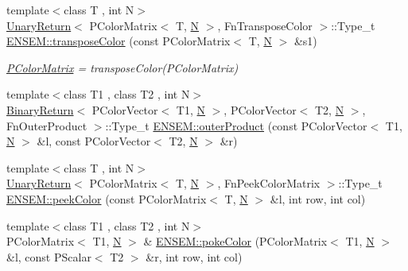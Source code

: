 \begin{DoxyCompactItemize}
\item 
{\footnotesize template$<$class T , int N$>$ }\\\mbox{\hyperlink{structUnaryReturn}{Unary\+Return}}$<$ P\+Color\+Matrix$<$ T, \mbox{\hyperlink{adat__devel_2lib_2hadron_2operator__name__util_8cc_a7722c8ecbb62d99aee7ce68b1752f337}{N}} $>$, Fn\+Transpose\+Color $>$\+::Type\+\_\+t \mbox{\hyperlink{group__primcolormatrix_gad27a30bd1b98827095b42464443c9ffc}{E\+N\+S\+E\+M\+::transpose\+Color}} (const P\+Color\+Matrix$<$ T, \mbox{\hyperlink{adat__devel_2lib_2hadron_2operator__name__util_8cc_a7722c8ecbb62d99aee7ce68b1752f337}{N}} $>$ \&s1)
\begin{DoxyCompactList}\small\item\em \mbox{\hyperlink{classENSEM_1_1PColorMatrix}{P\+Color\+Matrix}} = transpose\+Color(\+P\+Color\+Matrix) \end{DoxyCompactList}\item 
{\footnotesize template$<$class T1 , class T2 , int N$>$ }\\\mbox{\hyperlink{structBinaryReturn}{Binary\+Return}}$<$ P\+Color\+Vector$<$ T1, \mbox{\hyperlink{adat__devel_2lib_2hadron_2operator__name__util_8cc_a7722c8ecbb62d99aee7ce68b1752f337}{N}} $>$, P\+Color\+Vector$<$ T2, \mbox{\hyperlink{adat__devel_2lib_2hadron_2operator__name__util_8cc_a7722c8ecbb62d99aee7ce68b1752f337}{N}} $>$, Fn\+Outer\+Product $>$\+::Type\+\_\+t \mbox{\hyperlink{group__primcolormatrix_ga4f0b21163125568ab5bcbbef75a17973}{E\+N\+S\+E\+M\+::outer\+Product}} (const P\+Color\+Vector$<$ T1, \mbox{\hyperlink{adat__devel_2lib_2hadron_2operator__name__util_8cc_a7722c8ecbb62d99aee7ce68b1752f337}{N}} $>$ \&l, const P\+Color\+Vector$<$ T2, \mbox{\hyperlink{adat__devel_2lib_2hadron_2operator__name__util_8cc_a7722c8ecbb62d99aee7ce68b1752f337}{N}} $>$ \&r)
\item 
{\footnotesize template$<$class T , int N$>$ }\\\mbox{\hyperlink{structUnaryReturn}{Unary\+Return}}$<$ P\+Color\+Matrix$<$ T, \mbox{\hyperlink{adat__devel_2lib_2hadron_2operator__name__util_8cc_a7722c8ecbb62d99aee7ce68b1752f337}{N}} $>$, Fn\+Peek\+Color\+Matrix $>$\+::Type\+\_\+t \mbox{\hyperlink{group__primcolormatrix_ga44a6b0393ecffb0c4aecc93b45a8d12d}{E\+N\+S\+E\+M\+::peek\+Color}} (const P\+Color\+Matrix$<$ T, \mbox{\hyperlink{adat__devel_2lib_2hadron_2operator__name__util_8cc_a7722c8ecbb62d99aee7ce68b1752f337}{N}} $>$ \&l, int row, int col)
\item 
{\footnotesize template$<$class T1 , class T2 , int N$>$ }\\P\+Color\+Matrix$<$ T1, \mbox{\hyperlink{adat__devel_2lib_2hadron_2operator__name__util_8cc_a7722c8ecbb62d99aee7ce68b1752f337}{N}} $>$ \& \mbox{\hyperlink{group__primcolormatrix_ga83e068e757a42e9866992b38a003d7f9}{E\+N\+S\+E\+M\+::poke\+Color}} (P\+Color\+Matrix$<$ T1, \mbox{\hyperlink{adat__devel_2lib_2hadron_2operator__name__util_8cc_a7722c8ecbb62d99aee7ce68b1752f337}{N}} $>$ \&l, const P\+Scalar$<$ T2 $>$ \&r, int row, int col)

\end{DoxyCompactItemize}
